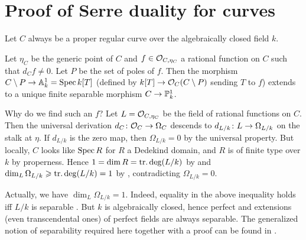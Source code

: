 \documentclass[a4paper,parskip=half,numbers=enddot, DIV=12]{scrreprt}
\renewcommand{\geq}{\geqslant}
\begin{document}
\section{Proof of Serre duality for curves}
Let $C$ always be a proper regular curve over the algebraically closed field $k$.
\begin{prop}
	Let $\eta_C$ be the generic point of $C$ and $f\in\mathcal{O}_{C,\eta_C}$ a rational function on $C$ such that $d_Cf\neq 0$. Let $P$ be the set of poles of $f$. Then the morphism $C\setminus P\morphism\IA_k^1=\Spec k[T]$ (defined by $k[T]\morphism\Oo_C(C\setminus P)$ sending $T$ to $f$) extends to a unique finite separable morphism $C\morphism\IP_k^1$.
\end{prop}
\begin{rem}
	\begin{alphanumerate}
		\item {}Why do we find such an $f$? Let $L=\mathcal{O}_{C,\eta_C}$ be the field of rational functions on $C$. Then the universal derivation $d_C\colon\Oo_C\morphism\Omega_C$ descends to $d_{L/k}\colon L\morphism\Omega_{L/k}$ on the stalk at $\eta$. If $d_{L/k}$ is the zero map, then $\Omega_{L/k}=0$ by the universal property. But locally, $C$ looks like $\operatorname{Spec} R$ for $R$ a Dedekind domain, and $R$ is of finite type over $k$ by properness. Hence $1=\dim R=\operatorname{tr.deg} (L/k)$ by \cite[Theorem~10]{alg1} and $\dim_L\Omega_{L/k}\geq\trdeg(L/k)=1$ by \cite[Corollary~16.17]{eisenbudCommAlg}, contradicting $\Omega_{L/k}=0$.
		\item Actually, we have $\dim_L\Omega_{L/k}=1$. Indeed, equality in the above inequality holds iff $L/k$ is separable \cite[Corollary~16.17]{eisenbudCommAlg}. But $k$ is algebraically closed, hence perfect and extensions (even transcendental ones) of perfect fields are always separable. The generalized notion of separability required here together with a proof can be found in \cite[Proposition~1.6.2]{alg2}.
	\end{alphanumerate}
\end{rem}
\end{document}
